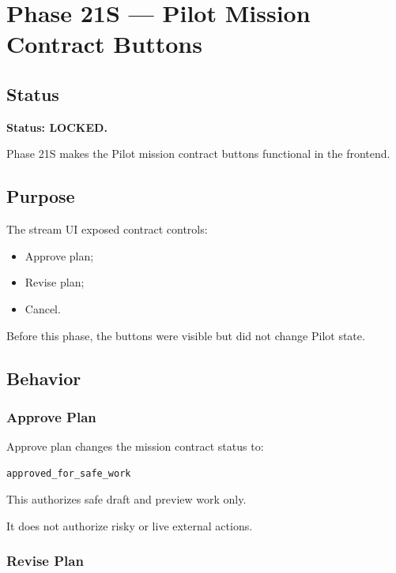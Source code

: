 \section{Phase 21S --- Pilot Mission Contract Buttons}
\label{sec:aion-phase21s-pilot-contract-buttons}

\subsection{Status}

\textbf{Status: LOCKED.}

Phase 21S makes the Pilot mission contract buttons functional in the frontend.

\subsection{Purpose}

The stream UI exposed contract controls:

\begin{itemize}
  \item Approve plan;
  \item Revise plan;
  \item Cancel.
\end{itemize}

Before this phase, the buttons were visible but did not change Pilot state.

\subsection{Behavior}

\subsubsection{Approve Plan}

Approve plan changes the mission contract status to:

\begin{verbatim}
approved_for_safe_work
\end{verbatim}

This authorizes safe draft and preview work only.

It does not authorize risky or live external actions.

\subsubsection{Revise Plan}

